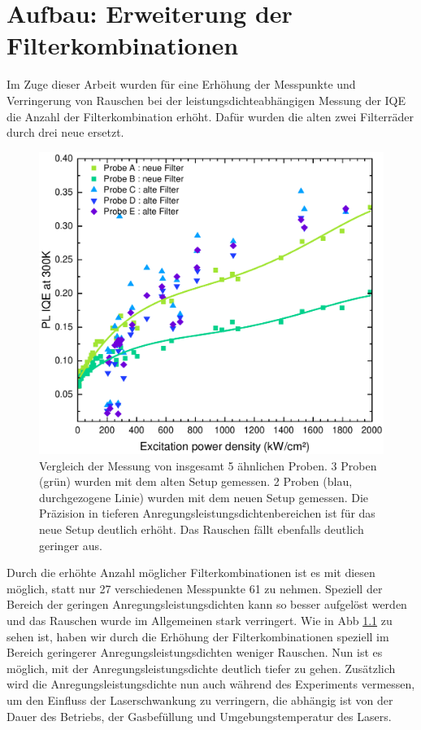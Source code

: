 \chapter{Aufbau: Erweiterung der Filterkombinationen}
\thispagestyle{fancy}

Im Zuge dieser Arbeit wurden für eine Erhöhung der Messpunkte und Verringerung von Rauschen bei der leistungsdichteabhängigen Messung der IQE die Anzahl der Filterkombination erhöht. Dafür wurden die alten zwei Filterräder durch drei neue ersetzt. 
%
\begin{figure}[ht!]
    \centering
    \begin{minipage}[t]{1\linewidth}
        \centering
        \includegraphics[width = 0.5\linewidth]{Bilder/AuswertungNovemeberKorr1VergleichFilter.pdf}
        \caption{Vergleich der Messung von insgesamt 5 ähnlichen Proben. 3 Proben (grün) wurden mit dem alten Setup gemessen. 2 Proben (blau, durchgezogene Linie) wurden mit dem neuen Setup gemessen. Die Präzision in tieferen Anregungsleistungsdichtenbereichen ist für das neue Setup deutlich erhöht. Das Rauschen fällt ebenfalls deutlich geringer aus. }
        \label{fig:vergleichFilter}
    \end{minipage}
\end{figure}
%
\newpage
Durch die erhöhte Anzahl möglicher Filterkombinationen ist es mit diesen möglich, statt nur 27 verschiedenen Messpunkte 61 zu nehmen. Speziell der Bereich der geringen Anregungsleistungsdichten kann so besser aufgelöst werden und das Rauschen wurde im Allgemeinen stark verringert. 
Wie in Abb \ref{fig:vergleichFilter} zu sehen ist, haben wir durch die Erhöhung der Filterkombinationen speziell im Bereich geringerer Anregungsleistungsdichten weniger Rauschen. Nun ist es möglich, mit der Anregungsleistungsdichte deutlich tiefer zu gehen. Zusätzlich wird die Anregungsleistungsdichte nun auch während des Experiments vermessen, um den Einfluss der Laserschwankung zu verringern, die abhängig ist von der Dauer des Betriebs, der Gasbefüllung und Umgebungstemperatur des Lasers. 
